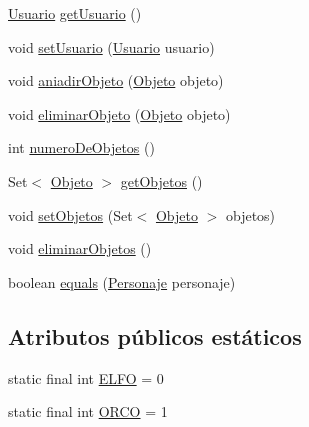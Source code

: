 \begin{DoxyCompactItemize}
\item 
\hyperlink{classes_1_1deusto_1_1spq_1_1_t_e_scc_1_1servidor_1_1jdo_1_1_usuario}{Usuario} \hyperlink{classes_1_1deusto_1_1spq_1_1_t_e_scc_1_1servidor_1_1jdo_1_1_personaje_a9e0c9ca1ba83ea4adb86cd76ebd91994}{get\+Usuario} ()
\item 
void \hyperlink{classes_1_1deusto_1_1spq_1_1_t_e_scc_1_1servidor_1_1jdo_1_1_personaje_ad534ed4aecebe26b0f58a6653511a616}{set\+Usuario} (\hyperlink{classes_1_1deusto_1_1spq_1_1_t_e_scc_1_1servidor_1_1jdo_1_1_usuario}{Usuario} usuario)
\item 
void \hyperlink{classes_1_1deusto_1_1spq_1_1_t_e_scc_1_1servidor_1_1jdo_1_1_personaje_a131ea503408934ada57d0735052fd3cc}{aniadir\+Objeto} (\hyperlink{classes_1_1deusto_1_1spq_1_1_t_e_scc_1_1servidor_1_1jdo_1_1_objeto}{Objeto} objeto)
\item 
void \hyperlink{classes_1_1deusto_1_1spq_1_1_t_e_scc_1_1servidor_1_1jdo_1_1_personaje_a4072746815ecdc3d8247fb15fe52af81}{eliminar\+Objeto} (\hyperlink{classes_1_1deusto_1_1spq_1_1_t_e_scc_1_1servidor_1_1jdo_1_1_objeto}{Objeto} objeto)
\item 
int \hyperlink{classes_1_1deusto_1_1spq_1_1_t_e_scc_1_1servidor_1_1jdo_1_1_personaje_a1a7eb741e3bc739f13507589f01fc6dc}{numero\+De\+Objetos} ()
\item 
Set$<$ \hyperlink{classes_1_1deusto_1_1spq_1_1_t_e_scc_1_1servidor_1_1jdo_1_1_objeto}{Objeto} $>$ \hyperlink{classes_1_1deusto_1_1spq_1_1_t_e_scc_1_1servidor_1_1jdo_1_1_personaje_aa62121153927ab27a7ad7c70f11d4605}{get\+Objetos} ()
\item 
void \hyperlink{classes_1_1deusto_1_1spq_1_1_t_e_scc_1_1servidor_1_1jdo_1_1_personaje_ad24469cbf24fa2ad9fa6f05788b4595c}{set\+Objetos} (Set$<$ \hyperlink{classes_1_1deusto_1_1spq_1_1_t_e_scc_1_1servidor_1_1jdo_1_1_objeto}{Objeto} $>$ objetos)
\item 
void \hyperlink{classes_1_1deusto_1_1spq_1_1_t_e_scc_1_1servidor_1_1jdo_1_1_personaje_a02e474c8d2e0c76986ffb6b9ad7132eb}{eliminar\+Objetos} ()
\item 
boolean \hyperlink{classes_1_1deusto_1_1spq_1_1_t_e_scc_1_1servidor_1_1jdo_1_1_personaje_afaec6f88a66ec02830a6793f7ff9c7ef}{equals} (\hyperlink{classes_1_1deusto_1_1spq_1_1_t_e_scc_1_1servidor_1_1jdo_1_1_personaje}{Personaje} personaje)
\end{DoxyCompactItemize}
\subsection*{Atributos públicos estáticos}
\begin{DoxyCompactItemize}
\item 
static final int \hyperlink{classes_1_1deusto_1_1spq_1_1_t_e_scc_1_1servidor_1_1jdo_1_1_personaje_adbeae4ec3cb0b38b82ab9f5272701c9c}{E\+L\+F\+O} = 0
\item 
static final int \hyperlink{classes_1_1deusto_1_1spq_1_1_t_e_scc_1_1servidor_1_1jdo_1_1_personaje_ae06424e76b975514c75a324d9cf991a3}{O\+R\+C\+O} = 1
\end{DoxyCompactItemize}


